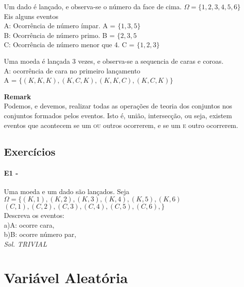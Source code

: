 \documentclass[10pt,a4paper]{article}
\begin{document}
\begin{eg} 
	Um dado é lançado, e observa-se o número da face de cima.
	$\Omega = \lbrace 1, 2, 3, 4, 5, 6 \rbrace$\\

	Eis alguns eventos\\
	A: Ocorrência de número ímpar. A = $\lbrace1, 3, 5 \rbrace$\\
	B: Ocorrência de número primo. B = $\lbrace2, 3, 5$\\
	C: Ocorrência de número menor que 4. C = $\lbrace1, 2, 3 \rbrace$\\
\end{eg}
\begin{eg}
	Uma moeda é lançada 3 vezes, e observa-se a sequencia de caras e coroas.\\
	A: ocorrência de cara no primeiro lançamento\\
	A = $\lbrace(K,K,K), (K,C,K), (K,K,C), (K,C,K) \rbrace$
\end{eg}

\begin{mdframed}[linewidth=0.6pt]
	\textbf{Remark}\\
	Podemos, e devemos, realizar todas as operações de teoria dos conjuntos nos conjuntos formados 
	pelos eventos. Isto é, união, intersecção, ou seja, existem eventos que acontecem se um 
	\textsc{ou} outros ocorrerem, e se um \textsc{e} outro ocorrerem.
\end{mdframed}

\subsection{Exercícios}
\paragraph{E1 - }Uma moeda e um dado são lançados. Seja\\
$\Omega = \lbrace(K,1), (K,2),(K,3),(K,4),(K,5),(K,6)$\\
$    (C,1),(C,2),(C,3),(C,4),(C,5),(C,6), \rbrace$\\
Descreva os eventos:\\
a)A: ocorre cara,\\
b)B: ocorre número par,\\
\textit{Sol. TRIVIAL}

\section{Variável Aleatória}
\end{document}
